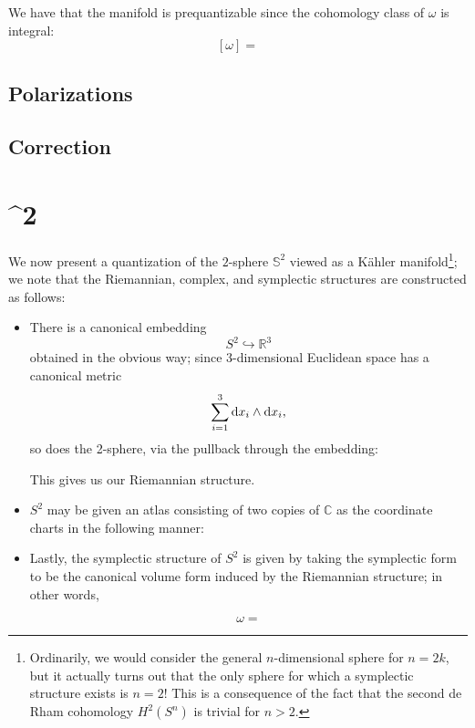We have that the manifold is prequantizable since the cohomology class of $\omega$ is integral:
$$
[\omega] = 
$$

\subsection{Polarizations}

\subsection{Correction}








\section{^2}
We now present a quantization of the $2$-sphere $\mathbb{S}^2$ viewed as a K\"{a}hler manifold\footnote{Ordinarily, we would consider the general $n$-dimensional sphere for $n = 2k$, but it actually turns out that the only sphere for which a symplectic structure exists is $n=2$! This is a consequence of the fact that the second de Rham cohomology $H^2(S^n)$ is trivial for $n > 2$.}; we note that the Riemannian, complex, and symplectic structures are constructed as follows:

\begin{itemize}
\item There is a canonical embedding
$$
S^2 \hookrightarrow \mathbb{R}^3
$$
obtained in the obvious way; since 3-dimensional Euclidean space has a canonical metric
$$
\sum_{i=1}^3 \mathrm{d} x_i \wedge \mathrm{d} x_i,
$$
so does the 2-sphere, via the pullback through the embedding:
$$
$$

This gives us our Riemannian structure.

\item $S^2$ may be given an atlas consisting of two copies of $\mathbb{C}$ as the coordinate charts in the following manner:%

\item Lastly, the symplectic structure of $S^2$ is given by taking the symplectic form to be the canonical volume form induced by the Riemannian structure; in other words,

$$
\omega = %
$$

\end{itemize}

